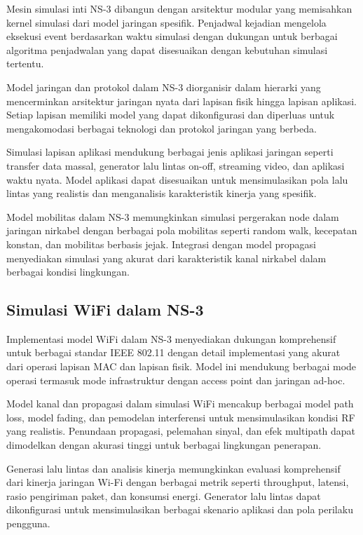 Mesin simulasi inti NS-3 dibangun dengan arsitektur modular yang memisahkan kernel simulasi dari model jaringan spesifik. Penjadwal kejadian mengelola eksekusi event berdasarkan waktu simulasi dengan dukungan untuk berbagai algoritma penjadwalan yang dapat disesuaikan dengan kebutuhan simulasi tertentu.

Model jaringan dan protokol dalam NS-3 diorganisir dalam hierarki yang mencerminkan arsitektur jaringan nyata dari lapisan fisik hingga lapisan aplikasi. Setiap lapisan memiliki model yang dapat dikonfigurasi dan diperluas untuk mengakomodasi berbagai teknologi dan protokol jaringan yang berbeda.

Simulasi lapisan aplikasi mendukung berbagai jenis aplikasi jaringan seperti transfer data massal, generator lalu lintas on-off, streaming video, dan aplikasi waktu nyata. Model aplikasi dapat disesuaikan untuk mensimulasikan pola lalu lintas yang realistis dan menganalisis karakteristik kinerja yang spesifik.

Model mobilitas dalam NS-3 memungkinkan simulasi pergerakan node dalam jaringan nirkabel dengan berbagai pola mobilitas seperti random walk, kecepatan konstan, dan mobilitas berbasis jejak. Integrasi dengan model propagasi menyediakan simulasi yang akurat dari karakteristik kanal nirkabel dalam berbagai kondisi lingkungan.

\subsection{Simulasi WiFi dalam NS-3}

Implementasi model WiFi dalam NS-3 menyediakan dukungan komprehensif untuk berbagai standar IEEE 802.11 dengan detail implementasi yang akurat dari operasi lapisan MAC dan lapisan fisik. Model ini mendukung berbagai mode operasi termasuk mode infrastruktur dengan access point dan jaringan ad-hoc.

Model kanal dan propagasi dalam simulasi WiFi mencakup berbagai model path loss, model fading, dan pemodelan interferensi untuk mensimulasikan kondisi RF yang realistis. Penundaan propagasi, pelemahan sinyal, dan efek multipath dapat dimodelkan dengan akurasi tinggi untuk berbagai lingkungan penerapan.

Generasi lalu lintas dan analisis kinerja memungkinkan evaluasi komprehensif dari kinerja jaringan Wi-Fi dengan berbagai metrik seperti throughput, latensi, rasio pengiriman paket, dan konsumsi energi. Generator lalu lintas dapat dikonfigurasi untuk mensimulasikan berbagai skenario aplikasi dan pola perilaku pengguna.

